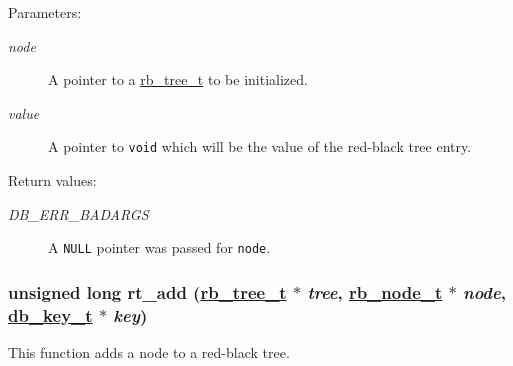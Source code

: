 \begin{Desc}
\item[Parameters:]
\begin{description}
\item[{\em node}]A pointer to a \hyperlink{group__dbprim__rbtree_a0}{rb\_\-tree\_\-t} to be initialized. \item[{\em value}]A pointer to {\tt void} which will be the value of the red-black tree entry.\end{description}
\end{Desc}
\begin{Desc}
\item[Return values:]
\begin{description}
\item[{\em DB\_\-ERR\_\-BADARGS}]A {\tt NULL} pointer was passed for {\tt node}. \end{description}
\end{Desc}
\hypertarget{group__dbprim__rbtree_a6}{
\subsubsection[rt\_\-add]{\setlength{\rightskip}{0pt plus 5cm}unsigned long rt\_\-add (\hyperlink{dbprim_8h_a0}{rb\_\-tree\_\-t} $\ast$ {\em tree}, \hyperlink{dbprim_8h_a1}{rb\_\-node\_\-t} $\ast$ {\em node}, \hyperlink{dbprim_8h_a0}{db\_\-key\_\-t} $\ast$ {\em key})}}
\label{group__dbprim__rbtree_a6}


This function adds a node to a red-black tree.

